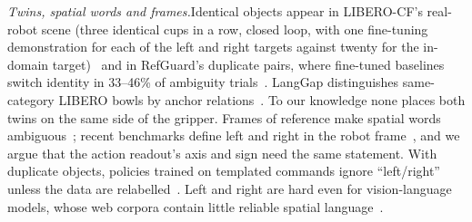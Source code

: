 \documentclass[conference]{IEEEtran}
\newcommand{\head}[1]{\textit{#1}\hspace{0.4em}}
\begin{document}
\head{Twins, spatial words and frames.}Identical objects appear in LIBERO-CF's real-robot scene (three identical cups in a row, closed loop, with one fine-tuning demonstration for each of the left and right targets against twenty for the in-domain target)~\cite{fang2026liberocf} and in RefGuard's duplicate pairs, where fine-tuned baselines switch identity in 33--46\% of ambiguity trials~\cite{wei2026refguard}. LangGap distinguishes same-category LIBERO bowls by anchor relations~\cite{hou2026langgap}. To our knowledge none places both twins on the same side of the gripper. Frames of reference make spatial words ambiguous~\cite{levinson2003space,zhang2025comfort}; recent benchmarks define left and right in the robot frame~\cite{akelijiang2026roboirgbench,zhao2026instructmove}, and we argue that the action readout's axis and sign need the same statement. With duplicate objects, policies trained on templated commands ignore ``left/right'' unless the data are relabelled~\cite{xiao2023robotic}. Left and right are hard even for vision-language models, whose web corpora contain little reliable spatial language~\cite{kamath2023whats}.
\end{document}
